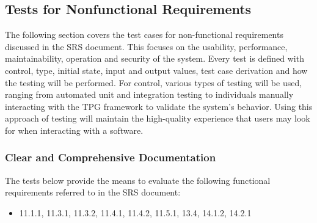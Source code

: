 \documentclass[12pt, titlepage]{article}
\begin{document}
\subsection{Tests for Nonfunctional Requirements}

The following section covers the test cases for non-functional requirements discussed in the SRS document. This focuses on the usability, performance, maintainability, operation and security of the system. Every test is defined with control, type, initial state, input and output values, test case derivation and how the testing will be performed. For control, various types of testing will be used, ranging from automated unit and integration testing to individuals manually interacting with the TPG framework to validate the system’s behavior. Using this approach of testing will maintain the high-quality experience that users may look for when interacting with a software.

\subsubsection{Clear and Comprehensive Documentation}

The tests below provide the means to evaluate the following functional requirements referred to in the SRS document:
\begin{itemize}
  \item 11.1.1, 11.3.1, 11.3.2, 11.4.1, 11.4.2, 11.5.1, 13.4, 14.1.2, 14.2.1
\end{itemize}
\end{document}
